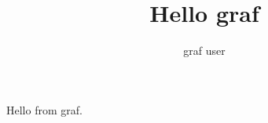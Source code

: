 \documentclass{article}
\title{Hello graf}
\author{graf user}
\begin{document}
\maketitle

Hello from graf.
\end{document}
